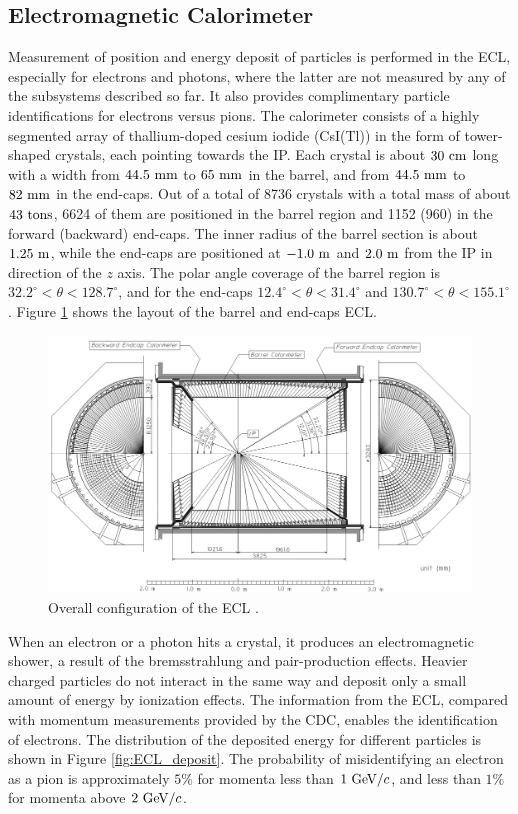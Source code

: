 \subsection{Electromagnetic Calorimeter}
Measurement of position and energy deposit of particles is performed in the ECL, especially for electrons and photons, where the latter are not measured by any of the subsystems described so far. It also provides complimentary particle identifications for electrons versus pions. The calorimeter consists of a highly segmented array of thallium-doped cesium iodide (CsI(Tl)) in the form of tower-shaped crystals, each pointing towards the IP. Each crystal is about $30\mathrm{~cm}$ long with a width from $44.5\mathrm{~mm}$ to $65\mathrm{~mm}$ in the barrel, and from $44.5\mathrm{~mm}$ to $82\mathrm{~mm}$ in the end-caps. Out of a total of 8736 crystals with a total mass of about $43\mathrm{~tons}$, 6624 of them are positioned in the barrel region and 1152 (960) in the forward (backward) end-caps. The inner radius of the barrel section is about $1.25\mathrm{~m}$, while the end-caps are positioned at $-1.0\mathrm{~m}$ and $2.0\mathrm{~m}$ from the IP in direction of the $z$ axis. The polar angle coverage of the barrel region is $32.2^\circ < \theta < 128.7^\circ$, and for the end-caps $12.4^\circ < \theta < 31.4^\circ$ and $130.7^\circ < \theta < 155.1^\circ$. Figure \ref{fig:ECL_layout} shows the layout of the barrel and end-caps ECL. 
\begin{figure}[!htb]
	\centering
	\captionsetup{width=0.8\linewidth}
	\includegraphics[width=\linewidth]{fig/setup/ECL_layout}
	\caption{Overall configuration of the ECL \cite{ABASHIAN2002117}.}
	\label{fig:ECL_layout}
\end{figure}
When an electron or a photon hits a crystal, it produces an electromagnetic shower, a result of the bremsstrahlung and pair-production effects. Heavier charged particles do not interact in the same way and deposit only a small amount of energy by ionization effects. The information from the ECL, compared with momentum measurements provided by the CDC, enables the identification of electrons. The distribution of the deposited energy for different particles is shown in Figure \ref{fig:ECL_deposit}. The probability of misidentifying an electron as a pion is approximately $5\%$ for momenta less than $1\mathrm{~GeV}/c$, and less than $1\%$ for momenta above $2\mathrm{~GeV}/c$.

